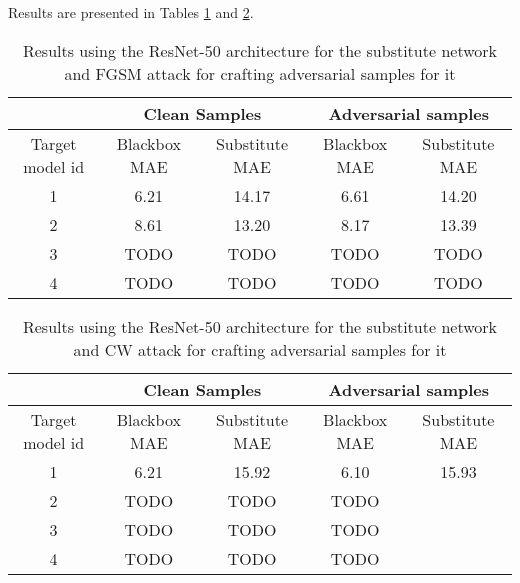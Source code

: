 Results are presented in Tables \ref{table:bbox-fgsm-resnet} and \ref{table:bbox-cw-resnet}.

\begin{table}[]
\begin{tabular}{|c|c|c|c|c|}
\hline
 & \multicolumn{2}{c|}{Clean Samples} & \multicolumn{2}{c|}{Adversarial samples} \\ \hline
Target model id & Blackbox MAE & Substitute MAE & Blackbox MAE & Substitute MAE \\ \hline
1 & 6.21 & 14.17 & 6.61 & 14.20 \\ \hline
2 & 8.61 & 13.20  &  8.17 & 13.39  \\ \hline
3 & TODO & TODO  & TODO & TODO  \\ \hline
4 & TODO & TODO & TODO & TODO \\ \hline
\end{tabular}
\caption{Results using the ResNet-50 architecture for the substitute network and FGSM attack for crafting adversarial samples for it}
\label{table:bbox-fgsm-resnet}
\end{table}


\begin{table}[]
\begin{tabular}{|c|c|c|c|c|}
\hline
 & \multicolumn{2}{c|}{Clean Samples} & \multicolumn{2}{c|}{Adversarial samples} \\ \hline
Target model id & Blackbox MAE & Substitute MAE & Blackbox MAE & Substitute MAE \\ \hline
1 & 6.21 & 15.92 & 6.10 & 15.93 \\ \hline
2 &  TODO & TODO  & TODO &  \\ \hline
3 &  TODO & TODO  & TODO &  \\ \hline
4 &  TODO & TODO  & TODO &  \\ \hline
\end{tabular}
\caption{Results using the ResNet-50 architecture for the substitute network and CW attack for crafting adversarial samples for it}
\label{table:bbox-cw-resnet}
\end{table}

